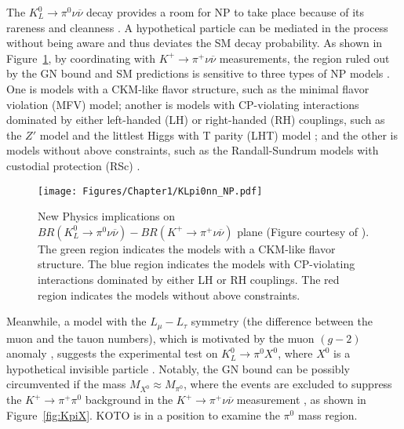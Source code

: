 The ${K_L^0\to\pi^0\nu\overline{\nu}}$ decay provides a room for NP to take place because of its rareness and cleanness \parencite{KLpi0nn_SUSY, KLpi0nn_MSSM, KLpi0nn_LFU, KLpi0nn_leptoquark, KLpi0nn_gluino, KLpi0nn_NP_constraint, KLpi0nn_higgs_doublet}. A hypothetical particle can be mediated in the process without being aware and thus deviates the SM decay probability. As shown in Figure~\ref{fig:KLpi0nn_NP}, by coordinating with ${K^+\to\pi^+\nu\overline{\nu}}$ measurements, the region ruled out by the GN bound and SM predictions is sensitive to three types of NP models \parencite{KLpi0nn_BSM}. One is models with a CKM-like flavor structure, such as the minimal flavor violation (MFV) model; another is models with CP-violating interactions dominated by either left-handed (LH) or right-handed (RH) couplings, such as the $Z'$ model \parencite{KLpi0nn_Z_Zprime} and the littlest Higgs with T parity (LHT) model \parencite{KLpi0nn_LHT}; and the other is models without above constraints, such as the Randall-Sundrum models with custodial protection (RSc) \parencite{KLpi0nn_RSc}.

\begin{figure}[h]
\begin{center}
\captionsetup{width=.99\linewidth}
\texttt{[image: Figures/Chapter1/KLpi0nn\_NP.pdf]}
\caption[New Physics implications on $\mathit{BR}(K_L^0\to\pi^0\nu\overline{\nu})-\mathit{BR}(K^+\to\pi^+\nu\overline{\nu})$ plane (Figure courtesy of \parencite{KLpi0nn_BSM}). ]{New Physics implications on $\mathit{BR}(K_L^0\to\pi^0\nu\overline{\nu})-\mathit{BR}(K^+\to\pi^+\nu\overline{\nu})$ plane (Figure courtesy of \parencite{KLpi0nn_BSM}). The green region indicates the models with a CKM-like flavor structure. The blue region indicates the models with CP-violating interactions dominated by either LH or RH couplings. The red region indicates the models without above constraints.}
\label{fig:KLpi0nn_NP}
\end{center}
\end{figure}

%
Meanwhile, a model with the ${L_{\mu}-L_{\tau}}$ symmetry (the difference between the muon and the tauon numbers), which is motivated by the muon $(g-2)$ anomaly \parencite{g-2}, suggests the experimental test on ${K_L^0\to\pi^0X^0}$, where $X^0$ is a hypothetical invisible particle \parencite{KLpi0nn_Zprime}. Notably, the GN bound can be possibly circumvented if the mass ${M_{X^0} \approx M_{\pi^0}}$, where the events are excluded to suppress the ${K^+\to\pi^+\pi^0}$ background in the ${K^+\to\pi^+\nu\overline{\nu}}$ measurement \parencite{KpiX}, as shown in Figure~\ref{fig:KpiX}. KOTO is in a position to examine the $\pi^0$ mass region.

